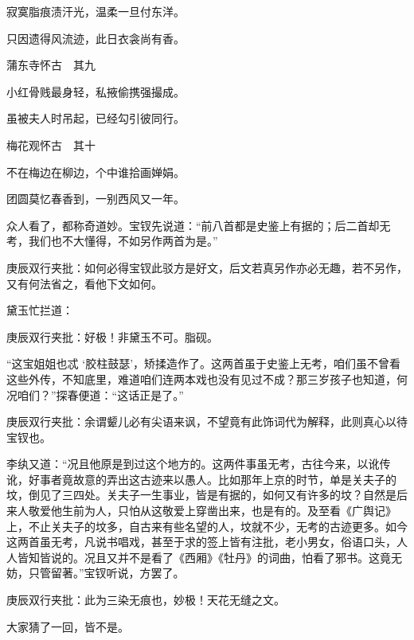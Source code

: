 \begin{poem}
\begin{pl}
        寂寞脂痕渍汗光，温柔一旦付东洋。
    \end{pl}
    \begin{pl}

        只因遗得风流迹，此日衣衾尚有香。
    \end{pl}
    \emptypl
    \begin{pl}

        蒲东寺怀古　其九
    \end{pl}
    \begin{pl}

        小红骨贱最身轻，私掖偷携强撮成。
    \end{pl}
    \begin{pl}

        虽被夫人时吊起，已经勾引彼同行。
    \end{pl}
    \emptypl
    \begin{pl}

        梅花观怀古　其十
    \end{pl}
    \begin{pl}

        不在梅边在柳边，个中谁拾画婵娟。
    \end{pl}
    \begin{pl}

        团圆莫忆春香到，一别西风又一年。
    \end{pl}
\end{poem}

\begin{parag}

    众人看了，都称奇道妙。宝钗先说道：“前八首都是史鉴上有据的；后二首却无考，我们也不大懂得，不如另作两首为是。”\begin{note}庚辰双行夹批：如何必得宝钗此驳方是好文，后文若真另作亦必无趣，若不另作，又有何法省之，看他下文如何。\end{note}黛玉忙拦道：\begin{note}庚辰双行夹批：好极！非黛玉不可。脂砚。\end{note}“这宝姐姐也忒 ‘胶柱鼓瑟’，矫揉造作了。这两首虽于史鉴上无考，咱们虽不曾看这些外传，不知底里，难道咱们连两本戏也没有见过不成？那三岁孩子也知道，何况咱们？”探春便道：“这话正是了。”\begin{note}庚辰双行夹批：余谓颦儿必有尖语来讽，不望竟有此饰词代为解释，此则真心以待宝钗也。\end{note}李纨又道：“况且他原是到过这个地方的。这两件事虽无考，古往今来，以讹传讹，好事者竟故意的弄出这古迹来以愚人。比如那年上京的时节，单是关夫子的坟，倒见了三四处。关夫子一生事业，皆是有据的，如何又有许多的坟？自然是后来人敬爱他生前为人，只怕从这敬爱上穿凿出来，也是有的。及至看《广舆记》上，不止关夫子的坟多，自古来有些名望的人，坟就不少，无考的古迹更多。如今这两首虽无考，凡说书唱戏，甚至于求的签上皆有注批，老小男女，俗语口头，人人皆知皆说的。况且又并不是看了《西厢》《牡丹》的词曲，怕看了邪书。这竟无妨，只管留著。”宝钗听说，方罢了。\begin{note}庚辰双行夹批：此为三染无痕也，妙极！天花无缝之文。\end{note}大家猜了一回，皆不是。
\end{parag}


